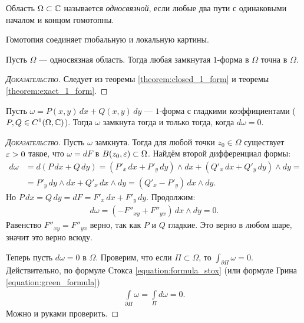 \begin{df}
 Область $\Omega \subset \mathbb{C}$ называется \textit{односвязной}, если любые два пути с одинаковыми началом и концом гомотопны.
\end{df}

Гомотопия соединяет глобальную и локальную картины.

\begin{crly}
 Пусть $\Omega$ --- односвязная область. Тогда любая замкнутая $1$-форма в $\Omega$ точна в $\Omega$.
\end{crly}
\begin{proof}[\normalfont\textsc{Доказательство}]
 Следует из теоремы \ref{theorem:closed_1_form} и теоремы \ref{theorem:exact_1_form}.
\end{proof}

\begin{thm}
 Пусть $\omega = P(x,y)\,dx + Q(x,y)\,dy$ --- $1$-форма с гладкими коэффициентами ($P, Q \in C^{1}(\Omega, \mathbb{C})$). Тогда $\omega$ замкнута тогда и только тогда, когда $d \omega = 0$.
\end{thm}
\begin{proof}[\normalfont\textsc{Доказательство}]
 Пусть $\omega$ замкнута. Тогда для любой точки $z_0 \in \Omega$  существует $\varepsilon > 0$ такое, что $\omega = dF$ в $B(z_0, \varepsilon) \subset \Omega$. Найдём второй дифференциал формы:
 \begin{align*}
  d \omega &= d(P\,dx + Q\,dy) = (P'_x \, dx + P'_y\,dy) \land dx + (Q'_x \, dx + Q'_y \, dy) \land dy = \\
  &= P'_y \, dy \land dx + Q'_x \, dx \land dy = (Q'_x - P'_y) \, dx \land dy.
 \end{align*} Но $P\,dx = Q \, dy = dF = F'_x \, dx + F'_y \, dy$. Продолжим:
 \begin{align*}
  d \omega = (-F''_{xy} + F''_{yx})\,dx \land dy = 0
 .\end{align*} Равенство $F''_{xy} = F''_{yx}$ верно, так как $P$ и $Q$ гладкие. Это верно в любом шаре, значит это верно всюду.


 Теперь пусть $d \omega = 0$ в $\Omega$. Проверим, что если $\Pi \subset \Omega$, то $\int_{\partial\Pi} \omega = 0 $. Действительно, по формуле Стокса \eqref{equation:formula_stox} (или формуле Грина \eqref{equation:green_formula})
 \begin{align*}
  \int\limits_{\partial\Pi} \omega = \int\limits_{\Pi} d\omega = 0.  
 \end{align*} Можно и руками проверить.
\end{proof}

